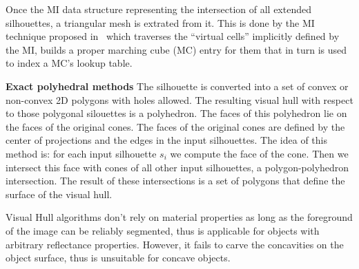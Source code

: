 Once the MI data structure representing the intersection of all extended silhouettes, a triangular mesh is extrated from it. This is done by the MI technique proposed in~\cite{rocchini2001marching} which traverses the ``virtual cells'' implicitly defined by the MI, builds a proper marching cube (MC) entry for them that in turn is used to index a MC's lookup table.

\textbf{Exact polyhedral methods} 
The silhouette is converted into a set of convex or non-convex 2D polygons with holes allowed. The resulting visual hull with respect to those polygonal silouettes is a polyhedron. The faces of this polyhedron lie on the faces of the original cones. The faces of the original cones are defined by the center of projections and the edges in the input silhouettes. The idea of this method is: for each input silhouette $s_i$ we compute the face of the cone. Then we intersect this face with cones of all other input silhouettes, \ie a polygon-polyhedron intersection. The result of these intersections is a set of polygons that define the surface of the visual hull.


Visual Hull algorithms don't rely on material properties as long as the foreground of the image can be reliably segmented, thus is applicable for objects with arbitrary reflectance properties. However, it fails to carve the concavities on the object surface, thus is unsuitable for concave objects.


